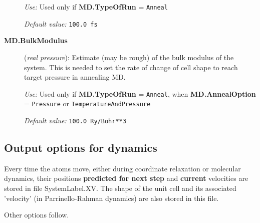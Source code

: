 \begin{description}
\textit{Use:} Used only if \textbf{MD.TypeOfRun} = \texttt{Anneal}

\textit{Default value:} \texttt{100.0 fs}

\item[\textbf{MD.BulkModulus}] (\textit{real pressure}):
   Estimate (may be rough)
  of the bulk modulus of the system.  This is needed to set the rate
  of change of cell shape to reach target pressure in annealing MD.

\textit{Use:} Used only if \textbf{MD.TypeOfRun} = \texttt{Anneal}, when
\textbf{MD.AnnealOption} = \texttt{Pressure} or \texttt{TemperatureAndPressure}

\textit{Default value:}  \texttt{100.0 Ry/Bohr**3}


\end{description}

\subsection{Output options for dynamics}

Every time the atoms move, either during coordinate relaxation or
molecular dynamics, their positions \textbf{predicted for next step} and
\textbf{current} velocities are stored in file SystemLabel.XV. The shape
of the unit cell and its associated 'velocity' (in Parrinello-Rahman
dynamics) are also stored in this file.

Other options follow.

